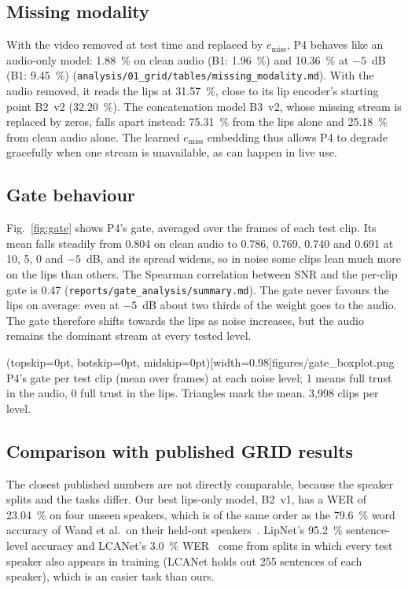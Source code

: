 \subsection{Missing modality}
With the video removed at test time and replaced by $e_{\text{miss}}$, P4 behaves like an audio-only
model: 1.88~\% on clean audio (B1: 1.96~\%) and 10.36~\% at $-5$~dB (B1: 9.45~\%)
(\texttt{analysis/\allowbreak{}01\_\allowbreak{}grid/\allowbreak{}tables/\allowbreak{}missing\_\allowbreak{}modality.md}). With the audio removed, it reads the lips
at 31.57~\%, close to its lip encoder's starting point B2~v2 (32.20~\%). The concatenation model
B3~v2, whose missing stream is replaced by zeros, falls apart instead: 75.31~\% from the lips alone
and 25.18~\% from clean audio alone. The learned $e_{\text{miss}}$ embedding thus allows P4 to degrade gracefully when one stream is
unavailable, as can happen in live use.

\subsection{Gate behaviour}
Fig.~\ref{fig:gate} shows P4's gate, averaged over the frames of each test clip. Its mean falls
steadily from 0.804 on clean audio to 0.786, 0.769, 0.740 and 0.691 at 10, 5, 0 and $-5$~dB, and its
spread widens, so in noise some clips lean much more on the lips than others. The Spearman
correlation between SNR and the per-clip gate is 0.47 (\texttt{reports/\allowbreak{}gate\_\allowbreak{}analysis/\allowbreak{}summary.md}).
The gate never favours the lips on average: even at $-5$~dB about two thirds of the weight goes to
the audio. The gate therefore shifts towards the lips as noise increases, but the audio remains the
dominant stream at every tested level.

\Figure[t!](topskip=0pt, botskip=0pt, midskip=0pt)[width=0.98\columnwidth]{figures/gate_boxplot.png}
{P4's gate per test clip (mean over frames) at each noise level; 1 means full trust in the
audio, 0 full trust in the lips. Triangles mark the mean. 3,998 clips per level.\label{fig:gate}}

\subsection{Comparison with published GRID results}
The closest published numbers are not directly comparable, because the speaker splits and the
tasks differ. Our best lips-only model, B2~v1, has a WER of 23.04~\% on four unseen speakers, which
is of the same order as the 79.6~\% word accuracy of Wand et al.\ on their held-out
speakers~\cite{wand2016}. LipNet's 95.2~\% sentence-level accuracy and LCANet's 3.0~\%
WER~\cite{assael2016,xu2018} come from splits in which every test speaker also appears in training
(LCANet holds out 255 sentences of each speaker), which is an easier task than ours.
